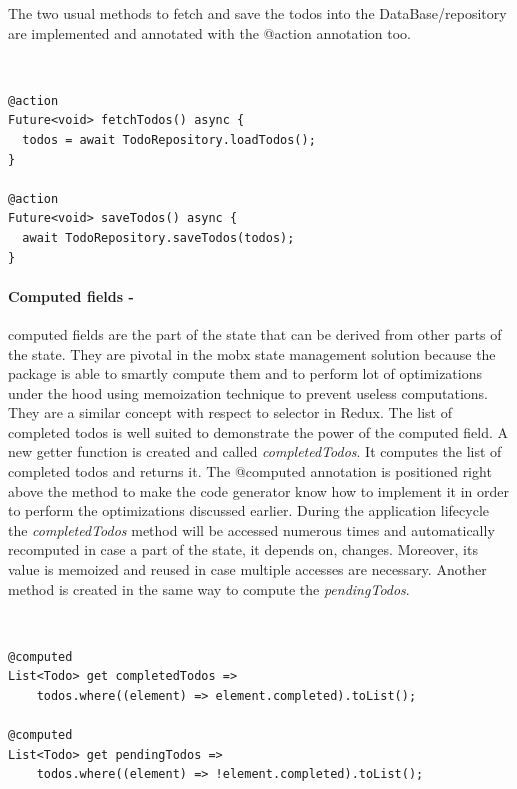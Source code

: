 The two usual methods to fetch and save the todos into the DataBase/repository are implemented and annotated with the @action annotation too.
\begin{code}
\mbox{}\\
 \mbox{}
		\label{code:2.14}
\begin{verbatim}
@action
Future<void> fetchTodos() async {
  todos = await TodoRepository.loadTodos();
}

@action
Future<void> saveTodos() async {
  await TodoRepository.saveTodos(todos);
}
\end{verbatim}
\mbox{}
\end{code}

\paragraph{Computed fields - }
\label{subpar:todo_app_bloc_core_state}computed fields are the part of the state that can be derived from other parts of the state. They are pivotal in the mobx state management solution because the package is able to smartly compute them and to perform lot of optimizations under the hood using memoization technique to prevent useless computations. They are a similar concept with respect to selector in Redux. The list of completed todos is well suited to demonstrate the power of the computed field. A new getter function is created and called \textit{completedTodos}. It computes the list of completed todos and returns it. The @computed annotation is positioned right above the method to make the code generator know how to implement it in order to perform the optimizations discussed earlier. During the application lifecycle the \textit{completedTodos} method will be accessed numerous times and automatically recomputed in case a part of the state, it depends on, changes. Moreover, its value is memoized and reused in case multiple accesses are necessary. Another method is created in the same way to compute the \textit{pendingTodos}.
\begin{code}
\mbox{}\\
 \mbox{}
		\label{code:2.14}
\begin{verbatim}
@computed
List<Todo> get completedTodos =>
    todos.where((element) => element.completed).toList();

@computed
List<Todo> get pendingTodos =>
    todos.where((element) => !element.completed).toList();
\end{verbatim}
\mbox{}
\end{code}


